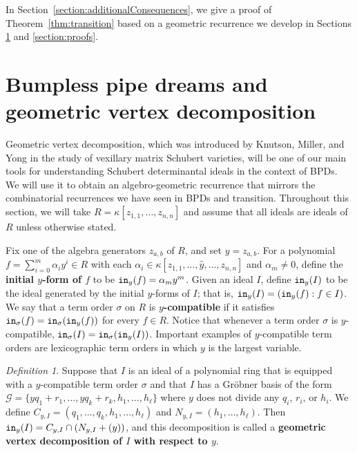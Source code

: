 \documentclass[12pt,reqno]{amsart}
\newtheorem{Main Conjecture}[theorem]{Main Conjecture}
\theoremstyle{remark}
\newtheorem{defn}[theorem]{Definition}
\theoremstyle{plain}
\newcommand{\mydef}[1]{{\bf #1}}
\newcommand{\init}{{\tt in}}
\begin{document}
 
In Section~\ref{section:additionalConsequences}, we give a proof of Theorem~\ref{thm:transition} based on a geometric recurrence we develop in Sections \ref{section:GVD} and \ref{section:proofs}.


\section{Bumpless pipe dreams and geometric vertex decomposition}\label{section:GVD}

Geometric vertex decomposition, which was introduced by Knutson, Miller, and Yong \cite{KMY09} in the study of vexillary matrix Schubert varieties, will be one of our main tools for understanding Schubert determinantal ideals in the context of BPDs.  We will use it to obtain an algebro-geometric recurrence that mirrors the combinatorial recurrences we have seen in BPDs and transition.  Throughout this section, we will take $R = \kappa[z_{1,1},\dots, z_{n,n}]$ and assume that all ideals are ideals of $R$ unless otherwise stated.

Fix one of the algebra generators $z_{a,b}$ of $R$, and set $y = z_{a,b}$.   For a polynomial $f =  \sum_{i = 0}^m \alpha_i y^i \in R$ with each $\alpha_i \in \kappa[z_{1,1},\dots,\widehat{y},\dots, z_{n,n}]$ and $\alpha_m \neq 0$, define the \mydef{initial $y$-form of $f$} to be $\init_y (f) =\alpha_m y^m$.  Given an ideal $I$, define $\init_y (I)$ to be the ideal generated by the initial $y$-forms of $I$; that is, $\init_y (I) = ( \init_y (f) : f \in I )$.   We say that a term order $\sigma$ on $R$ is \mydef{$y$-compatible} if it satisfies $\init_\sigma (f) = \init_\sigma(\init_y (f))$  for every $f\in R$. Notice that whenever a term order $\sigma$ is $y$-compatible, $\init_\sigma(I) = \init_\sigma(\init_y(I))$.  Important examples of $y$-compatible term orders are lexicographic term orders in which $y$ is the largest variable.  

\begin{defn}\label{def:gvd}\cite[Section 2.1]{KMY09}
Suppose that $I$ is an ideal of a polynomial ring that is equipped with  a $y$-compatible term order $\sigma$ and that $I$ has a Gr\"obner basis of the form $\mathcal{G} = \{yq_1+r_1, \ldots, yq_k+r_k, h_1, \ldots, h_\ell\}$ where $y$ does not divide any $q_i$, $r_i$, or $h_i$.  We define $C_{y,I} = (q_1, \ldots, q_k, h_1, \ldots, h_\ell)$ and $
N_{y,I} = (h_1, \ldots, h_\ell)$.  
Then $\init_y (I) = C_{y,I} \cap (N_{y,I}+(y))$, and this decomposition is called a \mydef{geometric vertex decomposition of $I$ with respect to $y$}.  
\end{defn}
\end{document}
